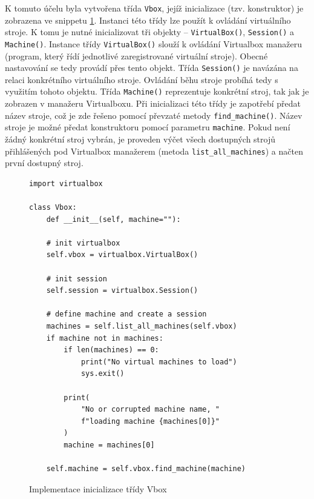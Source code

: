 \documentclass[thesis=M,czech,hidelinks]{FITthesis}[2013/05/06]
\begin{document}
K tomuto účelu byla vytvořena třída  \texttt{Vbox}, jejíž inicializace (tzv. konstruktor) je zobrazena ve snippetu \ref{snip:vboxmain}. Instanci této třídy lze použít k ovládání virtuálního stroje. K tomu je nutné inicializovat tři objekty – \texttt{VirtualBox()}, \texttt{Session()} a \texttt{Machine()}. Instance třídy \texttt{VirtualBox()} slouží k ovládání Virtualbox manažeru (program, který řídí jednotlivé zaregistrované virtuální stroje). Obecné nastavování se tedy provádí přes tento objekt. Třída \texttt{Session()} je navázána na relaci konkrétního virtuálního stroje. Ovládání běhu stroje probíhá tedy s využitím tohoto objektu. Třída \texttt{Machine()} reprezentuje konkrétní stroj, tak jak je zobrazen v manažeru Virtualboxu. Při inicializaci této třídy je zapotřebí předat název stroje, což je zde řešeno pomocí převzaté metody \texttt{find_machine()}. Název stroje je možné předat konstruktoru pomocí parametru \texttt{machine}. Pokud není žádný konkrétní stroj vybrán, je proveden výčet všech dostupných strojů přihlášených pod Virtualbox manažerem (metoda \texttt{list_all_machines}) a načten první dostupný stroj.
\begin{figure}[h]               
	\begin{verbatim}
import virtualbox

class Vbox:
    def __init__(self, machine=""):

    # init virtualbox
    self.vbox = virtualbox.VirtualBox()

    # init session
    self.session = virtualbox.Session()

    # define machine and create a session
    machines = self.list_all_machines(self.vbox)
    if machine not in machines:
        if len(machines) == 0:
            print("No virtual machines to load")
            sys.exit()

        print(
            "No or corrupted machine name, "
            f"loading machine {machines[0]}"
        )
        machine = machines[0]

    self.machine = self.vbox.find_machine(machine)
	\end{verbatim}      
	\caption{Implementace inicializace třídy Vbox}
	\label{snip:vboxmain}
\end{figure}
\end{document}
